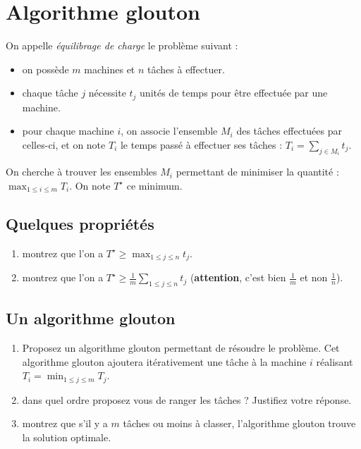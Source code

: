\documentclass
[12pt]
{article}
\begin{document}
\section{Algorithme glouton}

On appelle {\em équilibrage de charge} le problème suivant : 

\begin{itemize}
    \item on possède $m$ machines et $n$ tâches à effectuer.
    \item chaque tâche $j$ nécessite $t_j$ unités de temps pour être effectuée par une machine.
    \item pour chaque machine $i$, on associe l'ensemble $M_i$ des tâches effectuées par celles-ci, et on note $T_i$ le temps passé à effectuer ses tâches : $T_i = \sum_{j \in M_i} t_j$.
\end{itemize}

On cherche à trouver les ensembles $M_i$ permettant de minimiser la quantité : $\max_{1\leq i \leq m} T_i$. On note $T^\star$ ce minimum.

\subsection{Quelques propriétés}
\begin{enumerate}
    \item montrez que l'on a $T^\star \geq \max_{1 \leq j\leq n} t_j$.
    \item montrez que l'on a $T^\star \geq \frac{1}{m}\sum_{1 \leq j\leq n} t_j$ ({\bf attention}, c'est bien $\frac{1}{m}$ et non $\frac{1}{n}$).
\end{enumerate}

\subsection{Un algorithme glouton}

\begin{enumerate}
    \item Proposez un algorithme glouton permettant de résoudre le problème. Cet algorithme glouton ajoutera itérativement une tâche à la machine $i$ réalisant $T_i = \min_{1\leq j \leq m} T_j$.
    \item dans quel ordre proposez vous de ranger les tâches ? Justifiez votre réponse.
    \item montrez que s'il y a $m$ tâches ou moins à classer, l'algorithme glouton trouve la solution optimale.
\end{enumerate}
\end{document}
